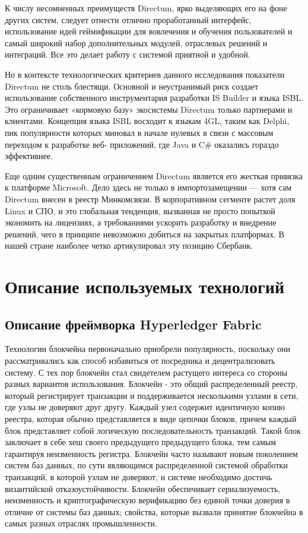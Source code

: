 К числу несомненных преимуществ Directum, ярко выделяющих его на фоне других систем, следует отнести отлично проработанный интерфейс, использование идей геймификации для вовлечения и обучения пользователей и самый широкий набор дополнительных модулей, отраслевых решений и интеграций. Все это делает работу с системой приятной и удобной.

Но в контексте технологических критериев данного исследования показатели Directum не столь блестящи. Основной и неустранимый риск создает использование собственного инструментария разработки IS Builder и языка ISBL. Это ограничивает
«кормовую базу» экосистемы Directum только партнерами и клиентами. Концепция языка ISBL восходит к языкам 4GL, таким как Delphi, пик популярности которых миновал в начале нулевых в связи с массовым переходом к разработке веб- приложений, где Java и C\# оказались гораздо эффективнее.

Еще одним существенным ограничением Directum является его жесткая привязка к платформе Microsoft. Дело здесь не только в импортозамещении — хотя сам Directum внесен в реестр Минкомсвязи. В корпоративном сегменте растет доля Linux и СПО, и это глобальная тенденция, вызванная не просто попыткой экономить на лицензиях, а требованиями ускорить разработку и внедрение решений, чего в принципе невозможно добиться на закрытых платформах. В нашей стране наиболее четко артикулировал эту позицию Сбербанк.
\section{Описание используемых технологий} \label{sec:ch1/sec3}

\subsection{Описание фреймворка Hyperledger Fabric} \label{subsec:ch1/sec3/subsec1}
Технологии блокчейна первоначально приобрели популярность, поскольку они рассматривались как способ избавиться от посредника и децентрализовать систему. С тех пор блокчейн стал свидетелем растущего интереса со стороны разных вариантов использования. Блокчейн - это общий распределенный реестр, который регистрирует транзакции и поддерживается несколькими узлами в сети, где узлы не доверяют друг другу. Каждый узел содержит идентичную копию реестра, которая обычно представляется в виде цепочки блоков, причем каждый блок представляет собой логическую последовательность транзакций. Такой блок заключает в себе хеш своего предыдущего предыдущего блока, тем самым гарантируя неизменность регистра.
Блокчейн часто называют новым поколением систем баз данных, по сути
являющимся распределенной системой обработки транзакций, в которой узлам не доверяют, и системе необходимо достичь византийской отказоустойчивости. Блокчейн обеспечивает сериализуемость, неизменность и криптографическую верификацию без единой точки доверия в отличие от системы баз данных; свойства, которые вызвали принятие блокчейна в самых разных отраслях промышленности.

